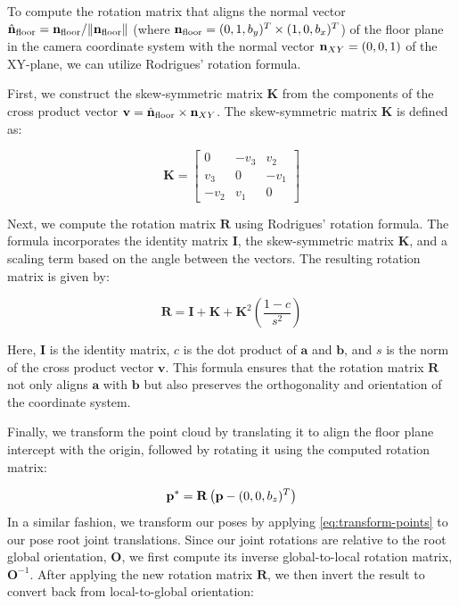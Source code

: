 To compute the rotation matrix that aligns the normal vector $\hat{\boldsymbol{\mathbf{n}}}_\text{floor} = \boldsymbol{\mathbf{n}}_\text{floor} / \| \boldsymbol{\mathbf{n}}_\text{floor} \|$ (where $\boldsymbol{\mathbf{n}}_\text{floor} = (0, 1, b_y)^T \times (1, 0, b_x)^T$) of the floor plane in the camera coordinate system with the normal vector $\boldsymbol{\mathbf{n}}_{XY} = (0, 0, 1)$ of the XY-plane, we can utilize Rodrigues' rotation formula. 

First, we construct the skew-symmetric matrix $\mathbf{K}$ from the components of the cross product vector $\boldsymbol{\mathbf{v}} = \hat{\boldsymbol{\mathbf{n}}}_\text{floor} \times \boldsymbol{\mathbf{n}}_{XY}$. The skew-symmetric matrix $\mathbf{K}$ is defined as:

\begin{equation}
    \mathbf{K} = \begin{bmatrix}
        0 & -v_3 & v_2 \\
        v_3 & 0 & -v_1 \\
        -v_2 & v_1 & 0
    \end{bmatrix}
\end{equation}

Next, we compute the rotation matrix $\mathbf{R}$ using Rodrigues' rotation formula. The formula incorporates the identity matrix $\mathbf{I}$, the skew-symmetric matrix $\mathbf{K}$, and a scaling term based on the angle between the vectors. The resulting rotation matrix is given by:

\begin{equation}
    \mathbf{R} = \mathbf{I} + \mathbf{K} + \mathbf{K}^2 \left(\frac{1 - c}{s^2}\right)
\end{equation}

Here, $\mathbf{I}$ is the identity matrix, $c$ is the dot product of $\mathbf{a}$ and $\mathbf{b}$, and $s$ is the norm of the cross product vector $\mathbf{v}$. This formula ensures that the rotation matrix $\mathbf{R}$ not only aligns $\mathbf{a}$ with $\mathbf{b}$ but also preserves the orthogonality and orientation of the coordinate system.

Finally, we transform the point cloud by translating it to align the floor plane intercept with the origin, followed by rotating it using the computed rotation matrix:

\begin{equation} \label{eq:transform-points}
    \boldsymbol{\mathbf{p}}^* = \mathbf{R} \left(\boldsymbol{\mathbf{p}} - (0, 0, b_z)^T \right) 
\end{equation}
In a similar fashion, we transform our poses by applying \cref{eq:transform-points} to our pose root joint translations. Since our joint rotations are relative to the root global orientation, $\mathbf{O}$, we first compute its inverse global-to-local rotation matrix, $\mathbf{O}^{-1}$. After applying the new rotation matrix $\mathbf{R}$, we then invert the result to convert back from local-to-global orientation:

